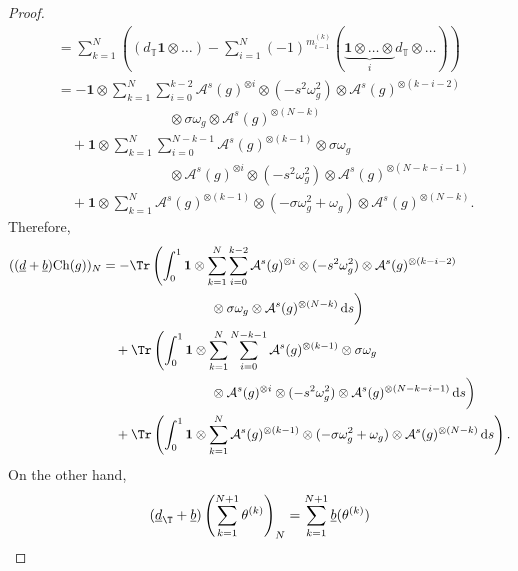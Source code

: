 \documentclass[a4paper, english, 12pt, bibliography=totocnumbered,
index=totoc]{scrartcl}
\begin{document}
\begin{proof}
\begin{align*}
		& = \sum_{k=1}^N\left((d_{\mathbb{T}} \mathbf{1} \otimes \ldots)
		- \sum_{i = 1}^N (-1)^{m_{i-1}^{(k)}} (\underbrace{\mathbf{1} \otimes
			\ldots \otimes}_i d_{\mathbb{T}} \otimes \ldots)\right) \\
		& = - \mathbf{1} \otimes \sum_{k=1}^N
		\sum_{i=0}^{k-2} \mathcal{A}^s(g)^{\otimes i} \otimes (-s^2
		\omega_g^2)
		\otimes \mathcal{A}^s(g)^{\otimes (k-i-2)} \\
		& \qquad \qquad \qquad \qquad \otimes \sigma \omega_g
		\otimes  {\mathcal A}^s(g)^{\otimes (N-k)} \\
		&\quad+ \mathbf{1} \otimes \sum_{k=1}^N
		\sum_{i=0}^{N-k-1} \mathcal A^s(g)^{\otimes (k-1)} \otimes
		\sigma \omega_g \\
		& \qquad \qquad \qquad \qquad \otimes \mathcal A^s(g)^{\otimes i}
		\otimes (-s^2\omega_g^2 ) \otimes
		{\mathcal A}^s(g)^{\otimes (N-k-i-1)} \\
		&\quad + \mathbf{1} \otimes \sum_{k=1}^N \mathcal
		A^s(g)^{\otimes (k-1)} \otimes (-\sigma\omega_g^2
		+\omega_g) \otimes \mathcal A^s(g)^{\otimes (N-k)}.
	\end{align*}
	Therefore,
	\begin{align*}
		((\underline{d} + \underline{b})\mathrm{Ch}(g))_N
		& = - \Tr \left(\int_0^1 \mathbf{1} \otimes \sum_{k=1}^N
		\sum_{i=0}^{k-2} \mathcal{A}^s(g)^{\otimes i} \otimes (-s^2
		\omega_g^2)
		\otimes \mathcal{A}^s(g)^{\otimes (k-i-2)} \right.\\
		& \left. \vphantom{\int_0^1}\qquad \qquad \qquad \qquad \otimes
		\sigma \omega_g
		\otimes  {\mathcal A}^s(g)^{\otimes (N-k)} \, \mathrm{d}s \right)\\
		&\quad+ \Tr\left(\int_0^1 \mathbf{1} \otimes \sum_{k=1}^N
		\sum_{i=0}^{N-k-1} \mathcal A^s(g)^{\otimes (k-1)} \otimes
		\sigma \omega_g \right.\\
		& \left. \vphantom{\int_0^1}\qquad \qquad \qquad \qquad \otimes
		\mathcal A^s(g)^{\otimes i}
		\otimes (-s^2\omega_g^2 ) \otimes
		{\mathcal A}^s(g)^{\otimes (N-k-i-1)} \, \mathrm{d}s \right)\\
		&\quad + \Tr\left(\int_0^1 \mathbf{1} \otimes \sum_{k=1}^N \mathcal
		A^s(g)^{\otimes (k-1)} \otimes (-\sigma\omega_g^2
		+\omega_g) \otimes \mathcal A^s(g)^{\otimes (N-k)} \, \mathrm{d}s
		\right).
	\end{align*}
	On the other hand,
	\begin{equation*}
		(\underline{d}_\T + \underline{b})\left(\sum_{k=1}^{N+1}
		\theta^{(k)}\right)_N = \sum_{k=1}^{N+1} \underline{b}(\theta^{(k)})
	\end{equation*}

\end{proof}
\end{document}
